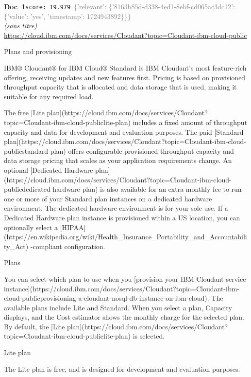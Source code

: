 \documentclass[a4paper,11pt]{article}
\begin{document}
\begin{docenv}
{\footnotesize\textcolor{doccolor}{\textbf{Doc~1}}}\hfill{\tiny\texttt{score:~19.979}}\ {\tiny\textcolor{gray}{\{'relevant': \{'8163b85d-d338-4ed1-8ebf-cd065ac3dc12': \{'value': 'yes', 'timestamp': 1724943892\}\}\}}}\\[3pt]
{\small\textit{(sans titre)}}\\[2pt]
{\tiny\url{https://cloud.ibm.com/docs/services/Cloudant?topic=Cloudant-ibm-cloud-public}}\\[4pt]
{\footnotesize 
Plans and provisioning 

IBM® Cloudant® for IBM Cloud® Standard is IBM Cloudant's most feature-rich offering, receiving updates and new features first. Pricing is based on provisioned throughput capacity that is allocated and data storage that is used, making it suitable for any required load.

The free [Lite plan](https://cloud.ibm.com/docs/services/Cloudant?topic=Cloudant-ibm-cloud-publiclite-plan) includes a fixed amount of throughput capacity and data for development and evaluation purposes. The paid [Standard plan](https://cloud.ibm.com/docs/services/Cloudant?topic=Cloudant-ibm-cloud-publicstandard-plan) offers configurable provisioned throughput capacity and data storage pricing that scales as your application requirements change. An optional [Dedicated Hardware plan](https://cloud.ibm.com/docs/services/Cloudant?topic=Cloudant-ibm-cloud-publicdedicated-hardware-plan) is also available for an extra monthly fee to run one or more of your Standard plan instances on a dedicated hardware environment. The dedicated hardware environment is for your sole use. If a Dedicated Hardware plan instance is provisioned within a US location, you can optionally select a [HIPAA](https://en.wikipedia.org/wiki/Health\_Insurance\_Portability\_and\_Accountability\_Act) -compliant configuration.



 Plans 

You can select which plan to use when you [provision your IBM Cloudant service instance](https://cloud.ibm.com/docs/services/Cloudant?topic=Cloudant-ibm-cloud-publicprovisioning-a-cloudant-nosql-db-instance-on-ibm-cloud). The available plans include Lite and Standard. When you select a plan, Capacity displays, and the Cost estimator shows the monthly charge for the selected plan. By default, the [Lite plan](https://cloud.ibm.com/docs/services/Cloudant?topic=Cloudant-ibm-cloud-publiclite-plan) is selected.



 Lite plan 

The Lite plan is free, and is designed for development and evaluation purposes.}
\end{docenv}
\end{document}
